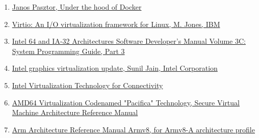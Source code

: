 \documentclass[14pt, a4paper]{article}
\begin{document}
\begin{enumerate}
    \item \href{https://pasztor.at/blog/under-the-hood-of-docker}{Janos Pasztor, Under the hood of Docker}
    \item \href{https://developer.ibm.com/articles/l-virtio}{Virtio: An I/O virtualization framework for Linux, M. Jones, IBM}
    \item \href{https://www.intel.com/content/dam/www/public/us/en/documents/manuals/64-ia-32-architectures-software-developer-vol-3c-part-3-manual.pdf}{Intel 64 and IA-32 Architectures Software Developer’s Manual Volume 3C: System Programming
    Guide, Part 3}
    \item \href{https://software.intel.com/sites/default/files/managed/fd/35/Intel%20Graphics%20Virtualization%20Update.docx}{Intel graphics virtualization update, Sunil Jain, Intel Corporation}
    \item \href{https://www.intel.com/content/dam/www/public/us/en/documents/technology-briefs/virtualization-technology-connectivity-brief.pdf}{Intel Virtualization Technology for Connectivity}
    \item \href{https://www.mimuw.edu.pl/~vincent/lecture6/sources/amd-pacifica-specification.pdf}{AMD64 Virtualization Codenamed "Pacifica" Technology, Secure Virtual Machine Architecture
    Reference Manual}
    \item \href{https://developer.arm.com/docs/ddi0487/latest/arm-architecture-reference-manual-armv8-for-armv8-a-architecture-profile}{Arm Architecture Reference Manual Armv8, for Armv8-A architecture profile}
\end{enumerate}
\end{document}
